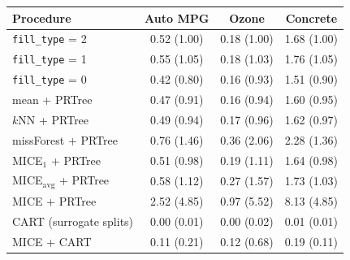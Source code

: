 \begin{tabular}{lccc}
\toprule
Procedure & Auto MPG & Ozone & Concrete\\
\midrule
\texttt{fill\_type} = 2 & 0.52 (1.00) & 0.18 (1.00) & 1.68 (1.00)\\
\texttt{fill\_type} = 1 & 0.55 (1.05) & 0.18 (1.03) & 1.76 (1.05)\\
\texttt{fill\_type} = 0 & 0.42 (0.80) & 0.16 (0.93) & 1.51 (0.90)\\
mean + PRTree & 0.47 (0.91) & 0.16 (0.94) & 1.60 (0.95)\\
$k$NN + PRTree & 0.49 (0.94) & 0.17 (0.96) & 1.62 (0.97)\\
missForest + PRTree & 0.76 (1.46) & 0.36 (2.06) & 2.28 (1.36)\\
MICE$_1$ + PRTree & 0.51 (0.98) & 0.19 (1.11) & 1.64 (0.98)\\
MICE$_{\mathrm{avg}}$ + PRTree & 0.58 (1.12) & 0.27 (1.57) & 1.73 (1.03)\\
MICE + PRTree & 2.52 (4.85) & 0.97 (5.52) & 8.13 (4.85)\\
CART (surrogate splits) & 0.00 (0.01) & 0.00 (0.02) & 0.01 (0.01)\\
MICE + CART & 0.11 (0.21) & 0.12 (0.68) & 0.19 (0.11)\\
\bottomrule
\end{tabular}
